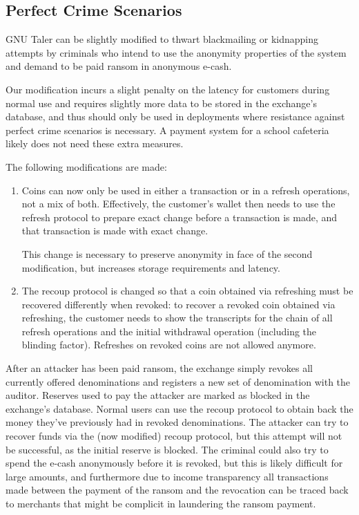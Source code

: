 \subsection{Perfect Crime Scenarios}\label{sec:design:blackmailing}

GNU Taler can be slightly modified to thwart blackmailing or kidnapping
attempts by criminals who intend to use the anonymity properties of the system
and demand to be paid ransom in anonymous e-cash.

Our modification incurs a slight penalty on the latency for customers during normal use and
requires slightly more data to be stored in the exchange's database, and thus
should only be used in deployments where resistance against perfect crime
scenarios is necessary.  A payment system for a school cafeteria likely does
not need these extra measures.

The following modifications are made:
\begin{enumerate}
  \item Coins can now only be used in either a transaction or in a refresh operations, not a mix of both.
    Effectively, the customer's wallet then needs to use the refresh protocol to prepare exact change
    before a transaction is made, and that transaction is made with exact change.

    This change is necessary to preserve anonymity in face of the second modification, but increases
    storage requirements and latency.
  \item The recoup protocol is changed so that a coin obtained
    via refreshing must be recovered differently when revoked: to recover a revoked coin
    obtained via refreshing, the customer needs to show the transcripts for the
    chain of all refresh operations and the initial withdrawal operation
    (including the blinding factor).  Refreshes on revoked coins are not
    allowed anymore.
\end{enumerate}

After an attacker has been paid ransom, the exchange simply revokes all currently offered denominations
and registers a new set of denomination with the auditor.
Reserves used to pay the attacker are marked as blocked in the exchange's
database.  Normal users can use the recoup protocol to obtain back the money
they've previously had in revoked denominations.  The attacker can try to
recover funds via the (now modified) recoup protocol, but this attempt will
not be successful, as the initial reserve is blocked.  The criminal could also
try to spend the e-cash anonymously before it is revoked, but this is likely
difficult for large amounts, and furthermore due to income transparency all
transactions made between the payment of the ransom and the revocation can be
traced back to merchants that might be complicit in laundering the ransom
payment.

